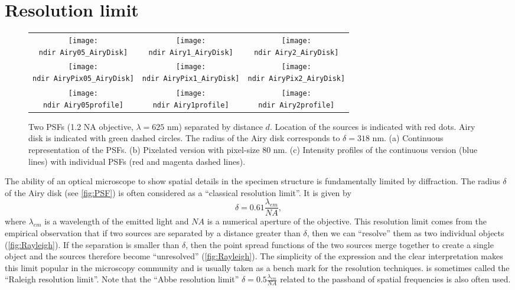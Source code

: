 
\section{Resolution limit \label{sec:Resolution limit}}

\begin{figure}[!bht]
	\centering
	\newcommand{\wf}{.3\textwidth}	
	\newcommand{\ndir}{figures/psfillustration/}
	\begin{tabular}{ccc}
		\subfloat[$d=\delta/2$]{\texttt{[image: \\ndir Airy05\_AiryDisk]}}
		& \subfloat[$d=\delta$]{\texttt{[image: \\ndir Airy1\_AiryDisk]}}
		& \subfloat[$d=2\delta$]{\texttt{[image: \\ndir Airy2\_AiryDisk]}}
		\tabularnewline
		\subfloat[$d=\delta/2$]{\texttt{[image: \\ndir AiryPix05\_AiryDisk]}}
		& \subfloat[$d=\delta$]{\texttt{[image: \\ndir AiryPix1\_AiryDisk]}}
		& \subfloat[$d=2\delta$]{\texttt{[image: \\ndir AiryPix2\_AiryDisk]}}
		\tabularnewline
		\subfloat[$d=\delta/2$]{\texttt{[image: \\ndir Airy05profile]}}
		& \subfloat[$d=\delta$]{\texttt{[image: \\ndir Airy1profile]}}
		& \subfloat[$d=2\delta$]{\texttt{[image: \\ndir Airy2profile]}}
		\tabularnewline
	\end{tabular}
	\caption{Two PSFs (1.2 NA objective, $\lambda=625$ nm) separated by distance $d$. Location of the sources is indicated with red dots. Airy disk is indicated with green dashed circles. The radius of the Airy disk corresponds to $\delta=318$ nm. (a) Continuous representation of the PSFs. (b) Pixelated version with pixel-size 80 nm. (c) Intensity profiles of the continuous version (blue lines) with individual PSFs (red and magenta dashed lines).}
	\label{fig:Rayleigh}
\end{figure}
%
The ability of an optical microscope to show spatial details in the specimen structure is fundamentally limited by diffraction. The radius $\delta$ of the Airy disk (see \autoref{fig:PSF}) is often considered as a ``classical resolution limit''. It is given by
%
\begin{equation}
 	\delta=0.61\frac{\lambda_{em}}{NA}, 
	\label{eq:Airy}
\end{equation}
%
where $\lambda_{em}$ is a wavelength of the emitted light and $NA$ is a numerical aperture of the objective. This resolution limit comes from the empirical observation that if two sources are separated by a distance greater than $\delta$, then we can ``resolve'' them as two individual objects (\autoref{fig:Rayleigh}\ccc). If the separation is smaller than $\delta$, then the point spread functions of the two sources merge together to create a single object and the sources therefore become ``unresolved'' (\autoref{fig:Rayleigh}\aaa). The simplicity of the expression and the clear interpretation makes this limit popular in the microscopy community and is usually taken as a bench mark for the resolution techniques.  is sometimes called  the ``Raleigh resolution limit''. Note that the ``Abbe resolution limit'' $\delta=0.5\frac{\lambda_{em}}{NA}$ related to the passband of spatial frequencies is also often used.

